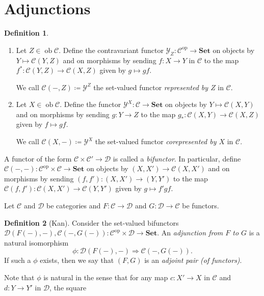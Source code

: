 \documentclass[10pt,letterpaper,cm]{nupset}
\theoremstyle{definition}
\newtheorem{definition}{Definition}[section]
\theoremstyle{theorem}
\theoremstyle{remark}
\newcommand{\1}{\mathbf{1}}
\renewcommand{\c}{\mathscr{C}}
\renewcommand{\d}{\mathscr{D}}
\newcommand{\y}{\mathscr{Y}}
\newcommand{\0}{\vec 0}
\DeclareMathOperator{\op}{op}
\DeclareMathOperator{\ob}{ob}
\begin{document}
\section{Adjunctions}

\begin{definition} $ $
\begin{enumerate}
\item Let $Z \in \ob \c$. Define the contravariant functor $\y_Z: \c^{\op} \to \mathbf{Set}$  on objects by $Y \mapsto \c(Y, Z)$ and on morphisms by sending $f: X \to Y$ in $\c$ to the map $f^{\ast} : \c(Y, Z) \to \c(X, Z)$ given by $g\mapsto gf$. 

We call $\c(-, Z)\coloneqq \y^Z$ the set-valued functor \textit{represented by $Z$} in $\c$.
\item Let $X \in \ob \c$. Define the functor $\y^X : \c \to \mathbf{Set}$ on objects by $Y \mapsto \c(X, Y)$  and on morphisms by sending $g: Y \to Z$ to the map $g_{\ast} : \c(X, Y) \to \c(X, Z)$ given by $f \mapsto gf$. 

We call $\c(X, -)\coloneqq\y^X$ the set-valued functor \textit{corepresented by $X$} in $\c$.
\end{enumerate}
\end{definition}

\smallskip

A functor of the form $\c \times \c' \to \d$ is called a \textit{bifunctor}.
In particular, define $\c(-, -): \c^{\op} \times \c \to \mathbf{Set}$ on objects by $\left(X, X'\right) \to \c(X, X')$ and on morphisms by sending $\left(f, f'\right) : \left(X, X'\right) \to \left(Y, Y'\right)$ to the map $\c(f, f') : \c(X, X') \to \c(Y, Y')$ given by $g \mapsto {f'}{g}{f}$.

\medskip

Let $\c$ and $\d$ be categories and $F : \c \to \d$ and $G: \d \to \c$ be functors. 


\begin{definition}[Kan]
Consider the set-valued bifunctors $ \d(F(-), -), \c(-, G(-)): \c^{\op} \times \d \to \mathbf{Set}$. An \textit{adjunction from $F$ to $G$} is a natural isomorphism $$\phi : \d(F(-), -) \Rightarrow \c(-, G(-)).$$
If such a $\phi$ exists, then we say that $\left(F, G\right)$ is an \textit{adjoint pair (of functors)}. 
\end{definition}

\smallskip


Note that $\phi$ is natural in the sense that for any map $c: X' \to X$ in $\c$ and $d: Y \to Y'$ in $\d$, the square
\end{document}
